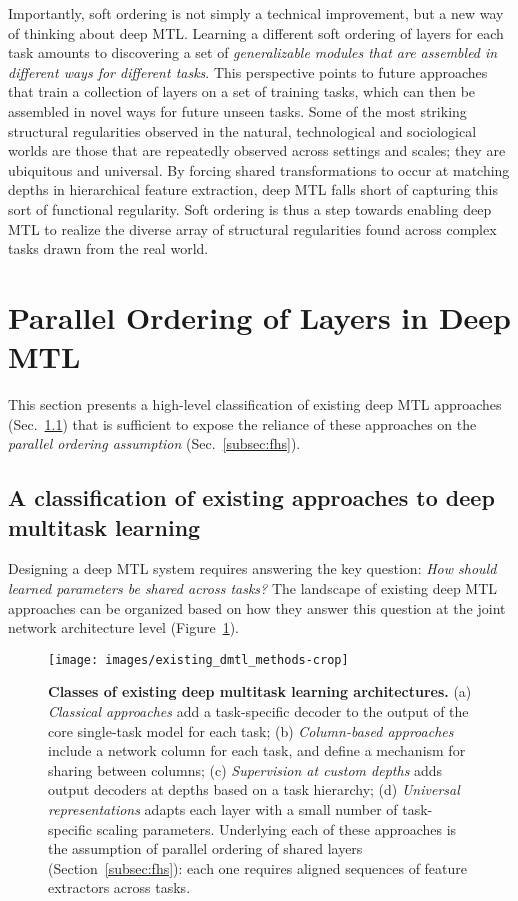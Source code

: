 \documentclass{article}
\theoremstyle{definition}
\theoremstyle{remark}
\begin{document}
Importantly, soft ordering is not simply a technical improvement, but a new way of thinking about deep MTL.
Learning a different soft ordering of layers for each task amounts to discovering a set of \emph{generalizable modules that are assembled in different ways for different tasks}.
This perspective points to future approaches that train a collection of layers on a set of training tasks, which can then be assembled in novel ways for future unseen tasks.
Some of the most striking structural regularities observed in the natural, technological and sociological worlds are those that are repeatedly observed across settings and scales; they are ubiquitous and universal. 
By forcing shared transformations to occur at matching depths in hierarchical feature extraction, deep MTL falls short of capturing this sort of functional regularity.
Soft ordering is thus a step towards enabling deep MTL to realize the diverse array of structural regularities found across complex tasks drawn from the real world.


\section{Parallel Ordering of Layers in Deep MTL} \label{sec:fhs}

This section presents a high-level classification of existing deep MTL approaches (Sec.~\ref{subsec:existing_approaches}) that is sufficient to expose the reliance of these approaches on the \emph{parallel ordering assumption} (Sec.~\ref{subsec:fhs}).

\subsection{A classification of existing approaches to deep multitask learning} \label{subsec:existing_approaches}

Designing a deep MTL system requires answering the key question: \emph{How should learned parameters be shared across tasks?}
The landscape of existing deep MTL approaches can be organized based on how they answer this question at the joint network architecture level (Figure~\ref{fig:existing_approaches}).

\begin{figure}
\texttt{[image: images/existing\_dmtl\_methods-crop]}
\caption{\textbf{Classes of existing deep multitask learning architectures.} (a) \emph{Classical approaches} add a task-specific decoder to the output of the core single-task model for each task; (b) \emph{Column-based approaches} include a network column for each task, and define a mechanism for sharing between columns; (c) \emph{Supervision at custom depths} adds output decoders at depths based on a task hierarchy; (d) \emph{Universal representations} adapts each layer with a small number of task-specific scaling parameters. Underlying each of these approaches is the assumption of parallel ordering of shared layers (Section~\ref{subsec:fhs}): each one requires aligned sequences of feature extractors across tasks.}
 \label{fig:existing_approaches}
\end{figure}
\end{document}
